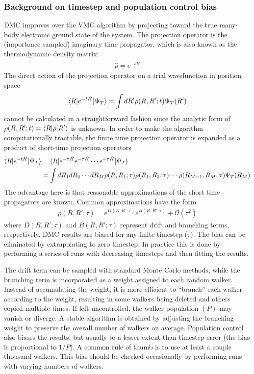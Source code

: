 \subsubsection{Background on timestep and population control bias}\label{sec:opt_background}
DMC improves over the VMC algorithm by projecting toward the true many-body electronic ground state of the system.  The projection operator is the (importance sampled) imaginary time propagator, which is also known as the thermodynamic density matrix:
\begin{align}
  \hat{\rho} = e^{-t\hat{H}}
\end{align}
The direct action of the projection operator on a trial wavefunction in position space
\begin{align}
  \langle R \rvert e^{-t\hat{H}}\lvert \Psi_T \rangle = \int dR' \rho(R,R';t)\Psi_T(R')
\end{align}
cannot be calculated in a straightforward fashion since the analytic form of $\rho(R,R';t)=\langle R \rvert\rho\lvert R' \rangle$ is unknown.  In order to make the algorithm computationally tractable, the finite time projection operator is expanded as a product of short-time projection operators
\begin{align}
  \langle R \rvert e^{-t{H}}\lvert \Psi_T \rangle &= \langle R \rvert e^{-\tau\hat{H}}e^{-\tau\hat{H}}\cdots e^{-\tau\hat{H}}\lvert \Psi_T \rangle\\
                                 &=\int dR_1dR_2\cdots dR_M \rho(R,R_1;\tau)\rho(R_1,R_2;\tau)\cdots\rho(R_{M-1},R_M;\tau)\Psi_T(R_M)
\end{align}
The advantage here is that reasonable approximations of the short time propagators are known.  Common approximations have the form
\begin{align}
  \rho(R,R';\tau) = e^{D(R,R';\tau)}e^{B(R,R';\tau)} + \mathcal{O}(\tau^2)
\end{align} 
where $D(R,R';\tau)$ and $B(R,R';\tau)$ represent drift and branching terms, respectively.  DMC results are biased for any finite timestep ($\tau$).  The bias can be eliminated by extrapolating to zero timestep.  In practice this is done by performing a series of runs with decreasing timesteps and then fitting the results.

The drift term can be sampled with standard Monte Carlo methods, while the branching term is incorporated as a weight assigned to each random walker.  Instead of accumulating the weight, it is more efficient to ``branch'' each walker according to the weight, resulting in some walkers being deleted and others copied multiple times.  If left uncontrolled, the walker population $(P)$ may vanish or diverge.  A stable algorithm is obtained by adjusting the branching weight to preserve the overall number of walkers on average.  Population control also biases the results, but usually to a lesser extent than timestep error (the bias is proportional to $1/P$).  A common rule of thumb is to use at least a couple thousand walkers.  This bias should be checked occasionally by performing runs with varying numbers of walkers.


